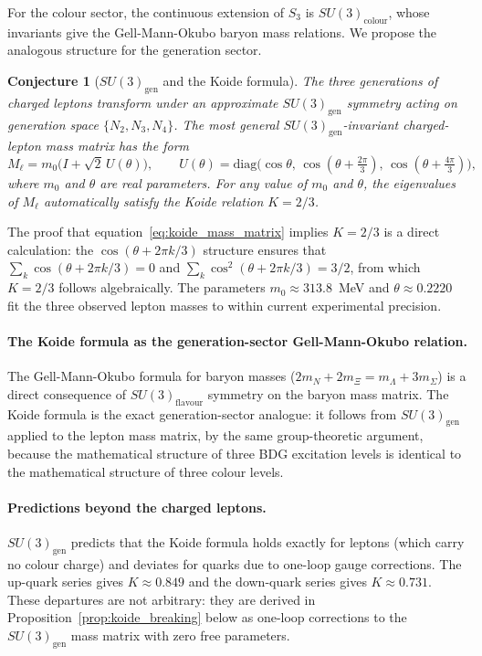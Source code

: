 \documentclass[11pt,a4paper]{article}
\newtheorem{conjecture}[theorem]{Conjecture}
\begin{document}
For the colour sector, the continuous extension of $S_3$ is $SU(3)_{\mathrm{colour}}$,
whose invariants give the Gell-Mann-Okubo baryon mass relations. We propose
the analogous structure for the generation sector.

\begin{conjecture}[$SU(3)_{\mathrm{gen}}$ and the Koide formula]
\label{conj:koide}
The three generations of charged leptons transform under an approximate
$SU(3)_{\mathrm{gen}}$ symmetry acting on generation space $\{N_2, N_3, N_4\}$.
The most general $SU(3)_{\mathrm{gen}}$-invariant charged-lepton mass matrix
has the form
\begin{equation}
  M_\ell = m_0\bigl(I + \sqrt{2}\,U(\theta)\bigr),
  \qquad
  U(\theta) = \mathrm{diag}\bigl(\cos\theta,\,
  \cos(\theta+\tfrac{2\pi}{3}),\, \cos(\theta+\tfrac{4\pi}{3})\bigr),
  \label{eq:koide_mass_matrix}
\end{equation}
where $m_0$ and $\theta$ are real parameters. For any value of $m_0$ and
$\theta$, the eigenvalues of $M_\ell$ automatically satisfy the Koide relation
$K = 2/3$.
\end{conjecture}

The proof that equation~\eqref{eq:koide_mass_matrix} implies $K = 2/3$
is a direct calculation: the $\cos(\theta + 2\pi k/3)$ structure ensures
that $\sum_k \cos(\theta + 2\pi k/3) = 0$ and
$\sum_k \cos^2(\theta + 2\pi k/3) = 3/2$, from which $K = 2/3$ follows
algebraically. The parameters $m_0 \approx 313.8$~MeV and $\theta \approx
0.2220$ fit the three observed lepton masses to within current experimental
precision.

\paragraph{The Koide formula as the generation-sector Gell-Mann-Okubo relation.}
The Gell-Mann-Okubo formula for baryon masses ($2m_N + 2m_\Xi = m_\Lambda + 3m_\Sigma$)
is a direct consequence of $SU(3)_{\mathrm{flavour}}$ symmetry on the baryon
mass matrix. The Koide formula is the exact generation-sector analogue: it
follows from $SU(3)_{\mathrm{gen}}$ applied to the lepton mass matrix, by
the same group-theoretic argument, because the mathematical structure of three
BDG excitation levels is identical to the mathematical structure of three
colour levels.

\paragraph{Predictions beyond the charged leptons.}
$SU(3)_{\mathrm{gen}}$ predicts that the Koide formula holds exactly for
leptons (which carry no colour charge) and deviates for quarks due to
one-loop gauge corrections. The up-quark series gives $K \approx 0.849$
and the down-quark series gives $K \approx 0.731$. These departures are
not arbitrary: they are derived in Proposition~\ref{prop:koide_breaking}
below as one-loop corrections to the $SU(3)_{\mathrm{gen}}$ mass matrix
with zero free parameters.
\end{document}
